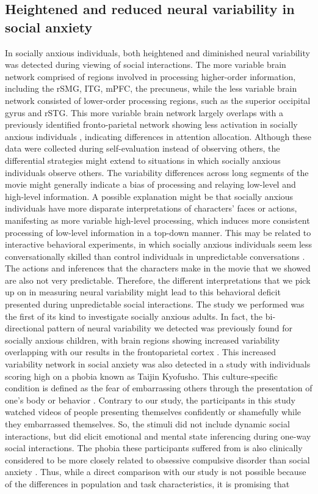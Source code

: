 \subsection{Heightened and reduced neural variability in social anxiety}
In socially anxious individuals, both heightened and diminished neural variability was detected during viewing of social interactions. The more variable brain network comprised of regions involved in processing higher-order information, including the rSMG, ITG, mPFC, the precuneus, while the less variable brain network consisted of lower-order processing regions, such as the superior occipital gyrus and rSTG. This more variable brain network largely overlaps with a previously identified fronto-parietal network showing less activation in socially anxious individuals \citep{koban2023}, indicating differences in attention allocation. Although these data were collected during self-evaluation instead of observing others, the differential strategies might extend to situations in which socially anxious individuals observe others. The variability differences across long segments of the movie might generally indicate a bias of processing and relaying low-level and high-level information. A possible explanation might be that socially anxious individuals have more disparate interpretations of characters' faces or actions, manifesting as more variable high-level processing, which induces more consistent processing of low-level information in a top-down manner. This may be related to interactive behavioral experiments, in which socially anxious individuals seem less conversationally skilled than control individuals in unpredictable conversations \citep{thompson2002,pilkonis1977}. The actions and inferences that the characters make in the movie that we showed are also not very predictable. Therefore, the different interpretations that we pick up on in measuring neural variability might lead to this behavioral deficit presented during unpredictable social interactions. The study we performed was the first of its kind to investigate socially anxious adults. In fact, the bi-directional pattern of neural variability we detected was previously found for socially anxious children, with brain regions showing increased variability overlapping with our results in the frontoparietal cortex \citep{camacho2023}. This increased variability network in social anxiety was also detected in a study with individuals scoring high on a phobia known as Taijin Kyofusho. This culture-specific condition is defined as the fear of embarrassing others through the presentation of one's body or behavior \citep{tei2020}. Contrary to our study, the participants in this study watched videos of people presenting themselves confidently or shamefully while they embarrassed themselves. So, the stimuli did not include dynamic social interactions, but did elicit emotional and mental state inferencing during one-way social interactions. The phobia these participants suffered from is also clinically considered to be more closely related to obsessive compulsive disorder than social anxiety \citep{apa2013}. Thus, while a direct comparison with our study is not possible because of the differences in population and task characteristics, it is promising that 